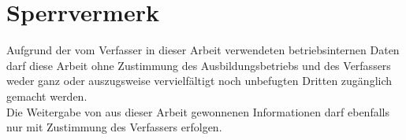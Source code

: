 \section*{Sperrvermerk}
Aufgrund der vom Verfasser in dieser Arbeit verwendeten betriebsinternen Daten
darf diese Arbeit ohne Zustimmung des Ausbildungsbetriebs und des Verfassers
weder ganz oder auszugsweise vervielfältigt noch unbefugten Dritten zugänglich
gemacht werden.\\
Die Weitergabe von aus dieser Arbeit gewonnenen Informationen darf ebenfalls
nur mit Zustimmung des Verfassers erfolgen.

\clearpage